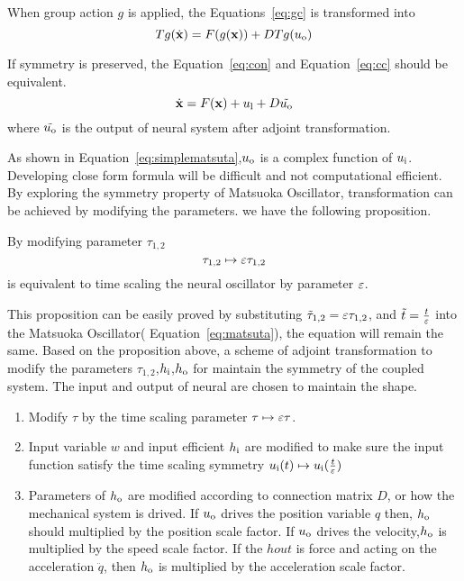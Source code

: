 When group action $g$ is applied, the Equations~\ref{eq:gc} is transformed into
\begin{equation}
\label{eq:cc}
Tg(\dot{\mathbf{x}})=F(g(\mathbf{x}))+DTg(u_{\mathrm{o}})
\end{equation}




If symmetry is preserved, the Equation~\ref{eq:con} and Equation~\ref{eq:cc} should be equivalent.
\begin{equation}
\label{eq:con}
\dot{\mathbf{x}}=F(\mathbf{x})+u_{\mathrm{l}}+D\tilde{u_{\mathrm{o}}}
\end{equation}
where $\tilde{u_{\mathrm{o}}}$ is the output of neural system after adjoint transformation.

As shown in Equation~\ref{eq:simplematsuta},$u_{\mathrm{o}}$ is a complex function of $u_{\mathrm{i}}$.
Developing close form formula will be difficult and not computational efficient.
By exploring the symmetry property of Matsuoka Oscillator, transformation can be achieved by modifying the parameters.
we have the following proposition.


\begin{myprop}
By modifying parameter $\tau_{1,2}$
\[
\tau_{1,2} \mapsto \varepsilon \tau_{1,2}
\]
is equivalent to time scaling the neural oscillator by parameter $\varepsilon$.
\end{myprop}

This proposition can be easily proved by  substituting $\tilde{\tau}_{1,2}=\varepsilon \tau_{1,2}$, and $\tilde{t}=\frac{t}{\varepsilon}$ into the Matsuoka Oscillator( Equation~\ref{eq:matsuta}), the equation will remain the same.
Based on the proposition above, a scheme of adjoint transformation to modify the parameters $\tau_{1,2}$,$h_{\mathrm{i}}$,$h_{\mathrm{o}}$ for maintain the symmetry of the  coupled system.
The input and output of neural are chosen to maintain the shape.
\begin{enumerate}
\item Modify $\tau$ by the time scaling parameter $\tau \mapsto \varepsilon \tau$.
\item Input variable $w$ and input efficient $h_{\mathrm{i}}$ are modified to make sure the input function satisfy the time scaling symmetry $u_{\mathrm{i}}(t) \mapsto u_{\mathrm{i}}(\frac{t}{\varepsilon})$
\item  Parameters of $h_{\mathrm{o}}$ are modified according to connection matrix $D$, or how the mechanical system is drived.
If $u_{\mathrm{o}}$ drives the position variable $q$ then, $h_{\mathrm{o}}$ should multiplied by the position scale factor. 
If $u_{\mathrm{o}}$ drives the velocity,$h_{\mathrm{o}}$ is multiplied by the speed scale factor.
If the $hout$ is force and acting on the acceleration $\ddot{q}$, then $h_{\mathrm{o}}$ is multiplied by the acceleration scale factor.
\end{enumerate}


